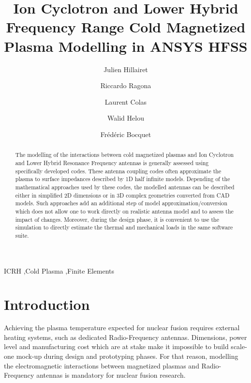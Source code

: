 \documentclass[preprint,3p,twocolumn]{elsarticle}
\begin{document}
\begin{frontmatter}

\title{Ion Cyclotron and Lower Hybrid Frequency Range Cold Magnetized Plasma Modelling in {ANSYS} {HFSS}}
\author[IRFM]{Julien Hillairet}
\author[ERM]{Riccardo Ragona}
\author[IRFM]{Laurent Colas}
\author[IRFM]{Walid Helou}
\author[ANSYS]{Frédéric Bocquet}

\address[IRFM]{CEA, IRFM, F-13108 Saint Paul-lez-Durance, France}
\address[ERM]{Laboratory for Plasma Physics, Royal Military Academy, (LPP-ERM/KMS), BE-1000, Brussels, Belgium}
\address[ANSYS]{ANSYS France}

\begin{abstract}
The modelling of the interactions between cold magnetized plasmas and Ion Cyclotron and Lower Hybrid Resonance Frequency antennas is generally assessed using specifically developed codes. These antenna coupling codes often approximate the plasma to surface impedances described by 1D half infinite models. Depending of the mathematical approaches used by these codes, the modelled antennas can be described either in simplified 2D dimensions or in 3D complex geometries converted from CAD models. Such approaches add an additional step of model approximation/conversion which does not allow one to work directly on realistic antenna model and to assess the impact of changes. Moreover, during the design phase, it is convenient to use the simulation to directly estimate the thermal and mechanical loads in the same software suite. 


\end{abstract}

\begin{keyword}
ICRH \sep Cold Plasma \sep Finite Elements
\end{keyword}

\end{frontmatter}

\linenumbers

\section{Introduction}
Achieving the plasma temperature expected for nuclear fusion requires external heating systems, such as dedicated Radio-Frequency antennas. Dimensions, power level and manufacturing cost which are at stake make it impossible to build scale-one mock-up during design and prototyping phases. For that reason, modelling the electromagnetic interactions between magnetized plasmas and Radio-Frequency antennas is mandatory for nuclear fusion research. 
\end{document}
